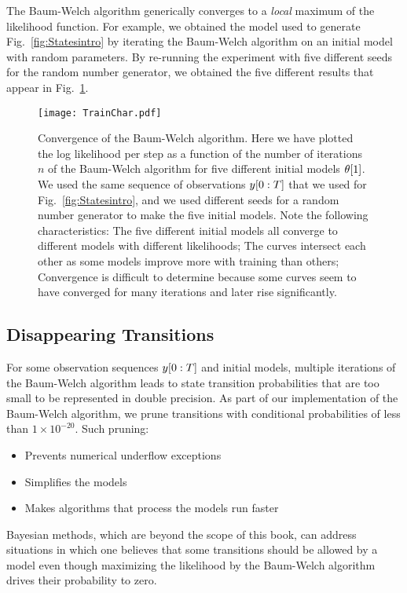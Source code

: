The Baum-Welch algorithm generically converges to a \emph{local}
maximum of the likelihood function.  For example, we obtained the
model used to generate Fig.~\ref{fig:Statesintro} by iterating the
Baum-Welch algorithm on an initial model with random parameters.  By
re-running the experiment with five different seeds for the random
number generator, we obtained the five different results that appear
in Fig.~\ref{fig:TrainChar}.
\begin{figure}
  \centering
  \texttt{[image: TrainChar.pdf]}
  \caption[Convergence of the Baum-Welch algorithm.]{%
    Convergence of the Baum-Welch algorithm.  Here we have
    plotted the log likelihood per step as a function of the number of
    iterations $n$ of the Baum-Welch algorithm for five different
    initial models ${\theta}{[1]}$.  We used the same sequence
    of observations $y[0:T]$ that we used for
    Fig.~\ref{fig:Statesintro}, and we used different seeds for a
    random number generator to make the five initial models.  Note the
    following characteristics: The five different initial models all
    converge to different models with different likelihoods; The curves
    intersect each other as some models improve more with training
    than others; Convergence is difficult to determine because some
    curves seem to have converged for many iterations and later rise
    significantly.  }
  \label{fig:TrainChar}
\end{figure}

\subsection{Disappearing Transitions}
\label{sec:disappear}

For some observation sequences $y[0:T]$ and initial models,
multiple iterations of the Baum-Welch algorithm leads to state
transition probabilities that are too small to be represented in
double precision.  As part of our implementation of the Baum-Welch
algorithm, we prune transitions with conditional probabilities of less
than $1\times 10^{-20}$.  Such pruning:
\begin{itemize}
\item Prevents numerical underflow exceptions
\item Simplifies the models
\item Makes algorithms that process the models run faster
\end{itemize}
Bayesian methods, which are beyond the scope of this book, can address
situations in which one believes that some transitions should be
allowed by a model even though maximizing the likelihood by the
Baum-Welch algorithm drives their probability to zero.

